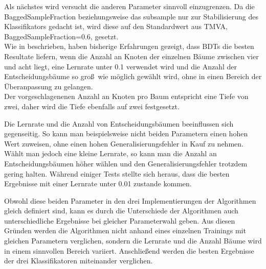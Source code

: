 Als n\"achstes wird versucht die anderen Parameter sinnvoll einzugrenzen. Da die BaggedSampleFraction beziehungsweise das subsample nur zur Stabilisierung des Klassifikators gedacht ist, wird diese auf den Standardwert aus TMVA, BaggedSampleFraction=\num{0,6}, gesetzt.\\
Wie in \cite{SWB-307748006} beschrieben, haben bisherige Erfahrungen gezeigt, dass BDTs die besten Resultate liefern, wenn die Anzahl an Knoten der einzelnen B\"aume zwischen vier und acht liegt, eine Lernrate unter \num{0,1} verwendet wird und die Anzahl der Entscheidungsb\"aume so gro\ss~wie m\"oglich gew\"ahlt wird, ohne in einen Bereich der \"Uberanpassung zu gelangen.\\
Der vorgeschlagenenen Anzahl an Knoten pro Baum entspricht eine Tiefe von zwei, daher wird die Tiefe ebenfalls auf zwei festgesetzt.

Die Lernrate und die Anzahl von Entscheidungsb\"aumen beeinflussen sich gegenseitig. So kann man beispielsweise nicht beiden Parametern einen hohen Wert zuweisen, ohne einen hohen Generalisierungsfehler in Kauf zu nehmen. W\"ahlt man jedoch eine kleine Lernrate, so kann man die Anzahl an Entscheidungsb\"aumen h\"oher w\"ahlen und den Generalisierungsfehler trotzdem gering halten. W\"ahrend einiger Tests stellte sich heraus, dass die besten Ergebnisse mit einer Lernrate unter \num{0,01} zustande kommen.

Obwohl diese beiden Parameter in den drei Implementierungen der Algorithmen gleich definiert sind, kann es durch die Unterschiede der Algorithmen auch unterschiedliche Ergebnisse bei gleicher Parameterwahl geben. Aus diesen Gr\"unden werden die Algorithmen nicht anhand eines einzelnen Trainings mit gleichen Parametern verglichen, sondern die Lernrate und die Anzahl B\"aume wird in einem sinnvollen Bereich variiert. Anschlie\ss end werden die besten Ergebnisse der drei Klassifikatoren miteinander verglichen.

